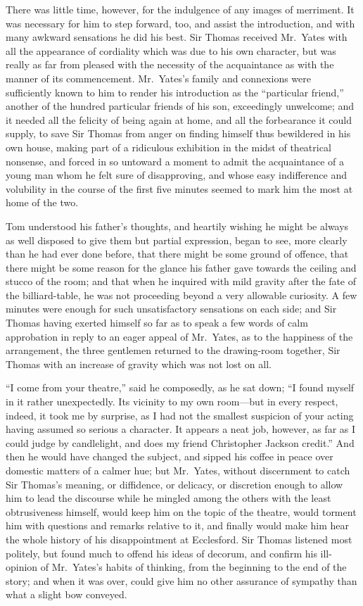 There was little time, however, for the indulgence
of any images of merriment.  It was necessary for him
to step forward, too, and assist the introduction,
and with many awkward sensations he did his best.
Sir Thomas received Mr.\ Yates with all the appearance
of cordiality which was due to his own character,
but was really as far from pleased with the necessity of
the acquaintance as with the manner of its commencement.
Mr.\ Yates's family and connexions were sufficiently known
to him to render his introduction as the ``particular friend,''
another of the hundred particular friends of his son,
exceedingly unwelcome; and it needed all the felicity of being
again at home, and all the forbearance it could supply,
to save Sir Thomas from anger on finding himself thus
bewildered in his own house, making part of a ridiculous
exhibition in the midst of theatrical nonsense, and forced
in so untoward a moment to admit the acquaintance of a young
man whom he felt sure of disapproving, and whose easy
indifference and volubility in the course of the first
five minutes seemed to mark him the most at home of the two.

Tom understood his father's thoughts, and heartily
wishing he might be always as well disposed to give them
but partial expression, began to see, more clearly than
he had ever done before, that there might be some ground
of offence, that there might be some reason for the glance
his father gave towards the ceiling and stucco of the room;
and that when he inquired with mild gravity after the fate
of the billiard-table, he was not proceeding beyond
a very allowable curiosity.  A few minutes were enough
for such unsatisfactory sensations on each side; and Sir
Thomas having exerted himself so far as to speak a few
words of calm approbation in reply to an eager appeal
of Mr.\ Yates, as to the happiness of the arrangement,
the three gentlemen returned to the drawing-room together,
Sir Thomas with an increase of gravity which was not
lost on all.

``I come from your theatre,'' said he composedly, as he
sat down; ``I found myself in it rather unexpectedly.
Its vicinity to my own room---but in every respect, indeed,
it took me by surprise, as I had not the smallest suspicion
of your acting having assumed so serious a character.
It appears a neat job, however, as far as I could judge
by candlelight, and does my friend Christopher Jackson credit.''
And then he would have changed the subject, and sipped
his coffee in peace over domestic matters of a calmer hue;
but Mr.\ Yates, without discernment to catch Sir Thomas's meaning,
or diffidence, or delicacy, or discretion enough to allow
him to lead the discourse while he mingled among the others
with the least obtrusiveness himself, would keep him on
the topic of the theatre, would torment him with questions
and remarks relative to it, and finally would make him hear
the whole history of his disappointment at Ecclesford.
Sir Thomas listened most politely, but found much to
offend his ideas of decorum, and confirm his ill-opinion
of Mr.\ Yates's habits of thinking, from the beginning
to the end of the story; and when it was over, could give
him no other assurance of sympathy than what a slight bow conveyed.

